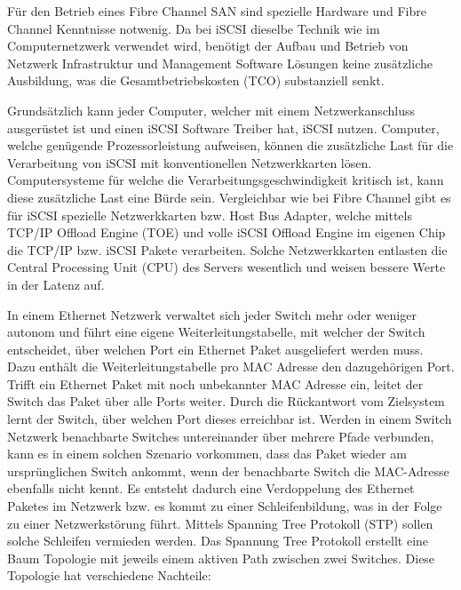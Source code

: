 Für den Betrieb eines Fibre Channel SAN sind spezielle Hardware und Fibre Channel Kenntnisse notwenig. Da bei iSCSI dieselbe Technik wie im Computernetzwerk verwendet wird, benötigt der Aufbau und Betrieb von Netzwerk Infrastruktur und Management Software Lösungen keine zusätzliche Ausbildung, was die Gesamtbetriebskosten (TCO) substanziell senkt.

Grundsätzlich kann jeder Computer, welcher mit einem Netzwerkanschluss ausgerüstet ist und einen iSCSI Software Treiber hat, iSCSI nutzen. Computer, welche genügende Prozessorleistung aufweisen, können die zusätzliche Last für die Verarbeitung von iSCSI mit konventionellen Netzwerkkarten lösen. Computersysteme für welche die Verarbeitungsgeschwindigkeit kritisch ist, kann diese zusätzliche Last eine Bürde sein. Vergleichbar wie bei Fibre Channel gibt es für iSCSI spezielle Netzwerkkarten bzw. Host Bus Adapter, welche mittels TCP/IP Offload Engine (TOE) und volle iSCSI Offload Engine im eigenen Chip die \gls{TCP/IP} bzw. iSCSI Pakete verarbeiten. Solche Netzwerkkarten entlasten die Central Processing Unit (\gls{CPU}) des Servers wesentlich und weisen bessere Werte in der Latenz auf.

In einem Ethernet Netzwerk verwaltet sich jeder Switch mehr oder weniger autonom und führt eine eigene Weiterleitungstabelle, mit welcher der Switch entscheidet, über welchen Port ein Ethernet Paket ausgeliefert werden muss. Dazu enthält die Weiterleitungstabelle pro MAC Adresse den dazugehörigen Port. Trifft ein Ethernet Paket mit noch unbekannter MAC Adresse ein, leitet der Switch das Paket über alle Ports weiter. Durch die Rückantwort vom Zielsystem lernt der Switch, über welchen Port dieses erreichbar ist. Werden in einem Switch Netzwerk benachbarte Switches untereinander über mehrere Pfade verbunden, kann es in einem solchen Szenario vorkommen, dass das Paket wieder am ursprünglichen Switch ankommt, wenn der benachbarte Switch die MAC-Adresse ebenfalls nicht kennt. Es entsteht dadurch eine Verdoppelung des Ethernet Paketes im Netzwerk bzw. es kommt zu einer Schleifenbildung, was in der Folge zu einer Netzwerkstörung führt. Mittels Spanning Tree Protokoll (STP) sollen solche Schleifen vermieden werden. Das Spannung Tree Protokoll erstellt eine Baum Topologie mit jeweils einem aktiven Path zwischen zwei Switches. Diese Topologie hat verschiedene Nachteile: 

